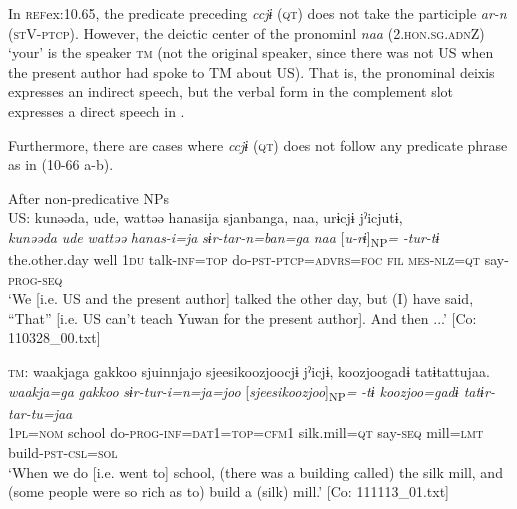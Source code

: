 In \textsc{ref}{ex:10.65}, the predicate preceding \textit{ccjɨ} (\textsc{qt}) does not take the participle \textit{ar-n} (\textsc{st}V-\textsc{ptcp}). However, the deictic center of the pronominl \textit{naa} (2.\textsc{hon}.\textsc{sg}.\textsc{adn}Z) ‘your’ is the speaker \textsc{tm} (not the original speaker, since there was not US when the present author had spoke to TM about US). That is, the pronominal deixis expresses an indirect speech, but the verbal form in the complement slot expresses a direct speech in .

  Furthermore, there are cases where \textit{ccjɨ} (\textsc{qt}) does not follow any predicate phrase as in (10-66 a-b).

\ea\label{ex:10.66}   After non-predicative NPs\\
  \ea  US: \glll kunəəda,  ude,  wattəə  hanasija  sjanbanga,   naa,  urɨcjɨ  jˀicjutɨ,\\
      \textit{kunəəda}  \textit{ude}  \textit{wattəə}  \textit{hanas-i=ja}  \textit{sɨr-tar-n=ban=ga}  \textit{naa}  [\textit{u-rɨ}]\textsubscript{NP}\textit{=}  \textit{-tur-tɨ}\\
      the.other.day  well  1\textsc{du}  talk-\textsc{inf}=\textsc{top}  do-\textsc{pst}-\textsc{ptcp}=\textsc{advrs}=\textsc{foc}  \textsc{fil}  \textsc{mes}-\textsc{nlz}=\textsc{qt}  say-\textsc{prog}-\textsc{seq}\\
      \glt       ‘We [i.e. US and the present author] talked the other day, but (I) have said, “That” [i.e. US can’t teach Yuwan for the present author]. And then ...’ [Co: 110328\_00.txt]

  \ex  \textsc{tm}:     \glll    waakjaga  {\textbar}gakkoo{\textbar}  sjuinnjajo  {\textbar}sjeesikoozjoo{\textbar}cjɨ    jˀicjɨ,  {\textbar}koozjoo{\textbar}gadɨ  tatɨtattujaa.\\
      \textit{waakja=ga}  \textit{gakkoo}  \textit{sɨr-tur-i=n=ja=joo}  [\textit{sjeesikoozjoo}]\textsubscript{NP}\textit{=}  \textit{-tɨ  koozjoo=gadɨ  tatɨr-tar-tu=jaa}\\
      1\textsc{pl}=\textsc{nom}  school  do{}-\textsc{prog}-\textsc{inf}=\textsc{dat}1=\textsc{top}=\textsc{cfm}1  silk.mill=\textsc{qt} say-\textsc{seq}  mill=\textsc{lmt}  build-\textsc{pst}-\textsc{csl}=\textsc{sol}\\
      \glt       ‘When we do [i.e. went to] school, (there was a building called) the silk mill, and (some people were so rich as to) build a (silk) mill.’ [Co: 111113\_01.txt]
    \z
\z

